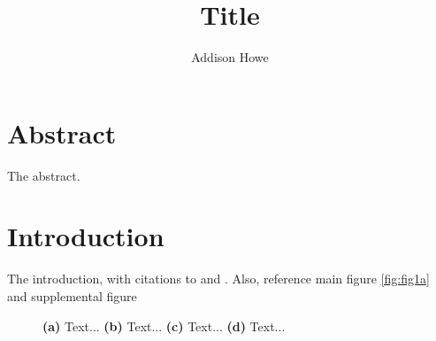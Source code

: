 \documentclass{article}
\title{Title}
\author{Addison Howe}
\date{}
\begin{document}
\maketitle


\section{Abstract}

The abstract.   

\section{Introduction}

The introduction, with citations to \citep{placeholder-ref1} and \citep{placeholder-ref2}. 
Also, reference main figure \ref{fig:fig1a} and supplemental figure 

\begin{figure}
    \centering

    
    \caption{%
        \textbf{(a)} 
        Text...
        \textbf{(b)} 
        Text...
        \textbf{(c)} 
        Text...
        \textbf{(d)} 
        Text...
    }
    \label{fig:fig1}
\end{figure}
\end{document}
